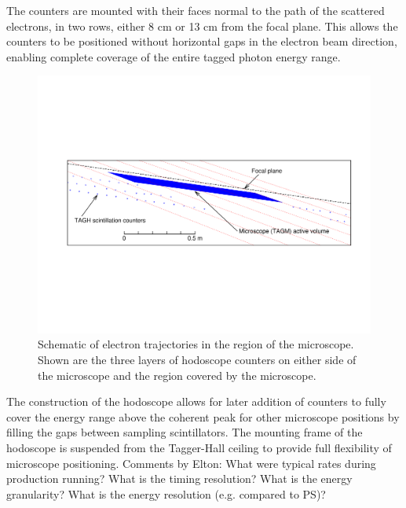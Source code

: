 The counters are mounted with their faces normal to the path of the scattered electrons, in two rows, either 8 cm or 13 cm from the focal plane.
This allows the counters to be positioned without horizontal gaps in the electron beam direction, enabling complete coverage of the entire tagged photon energy range.

\begin{figure}[tbp]
\begin{center}
      \includegraphics[width=0.95\linewidth,viewport=80 200 750 400]{figures/BEAM_taggerdetectors.pdf}
\caption{Schematic of electron trajectories in the region of the microscope. Shown are the three layers of hodoscope counters on either side of the microscope and the 
               region covered by the microscope.
       \label{fig:beam:BEAM_taggerdetectors}  }

\end{center}
\end{figure}

The construction of the hodoscope allows for later addition of counters to fully cover the energy range above the coherent peak for other microscope positions by filling the gaps between sampling scintillators. The mounting frame of the hodoscope is suspended from the Tagger-Hall ceiling to provide full flexibility of microscope positioning.
{\color{red} Comments by Elton: What were typical rates during production running? What is the timing resolution? What is the energy granularity? What is the energy resolution (e.g. compared to PS)?}

